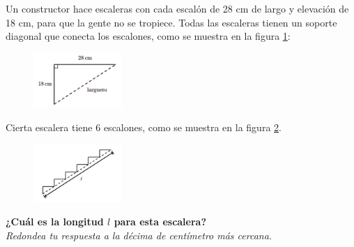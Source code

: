 Un constructor hace escaleras con cada escalón de 28 cm de largo y
elevación de 18 cm, para que la gente no se tropiece. Todas las escaleras tienen un soporte diagonal
que conecta los escalones, como se muestra en la figura \ref{fig:des_pitagoras_02a}:

\begin{figure}[H]
    \begin{center}
        \includegraphics[width=0.3\textwidth]{../images/des_pitagoras_02a.png}
    \end{center}
    \caption{}
    \label{fig:des_pitagoras_02a}
\end{figure}
Cierta escalera tiene 6 escalones, como se muestra en la figura \ref{fig:des_pitagoras_02b}.
\begin{figure}[H]
    \begin{center}
        \includegraphics[width=0.3\textwidth]{../images/des_pitagoras_02b.png}
    \end{center}
    \caption{}
    \label{fig:des_pitagoras_02b}
\end{figure}
\textbf{¿Cuál es la longitud $l$ para esta escalera?}\\
\textit{Redondea tu respuesta a la décima de centímetro más cercana.}
